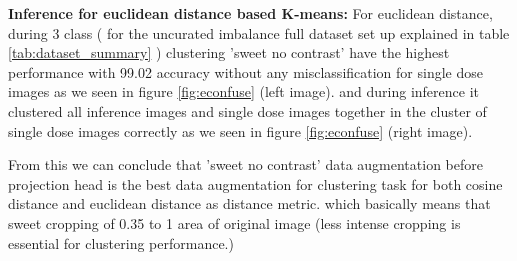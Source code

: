 \textbf{Inference for euclidean distance based K-means:}
For euclidean distance, during 3 class ( for the uncurated imbalance full dataset set up explained in table \ref{tab:dataset_summary} ) clustering 'sweet no contrast' have the highest performance with 99.02 accuracy without any misclassification for single dose images as we seen 
in figure \ref{fig:econfuse} (left image). and during inference it clustered all inference images and single dose images together in the cluster of single dose images correctly as we seen in figure \ref{fig:econfuse} (right image).


From this we can conclude that 'sweet no contrast' data augmentation before projection head is the best data augmentation for clustering task for both cosine distance and euclidean distance as distance metric. which basically means that sweet cropping of 0.35 to 1 area of original image (less intense cropping is essential for clustering performance.)



